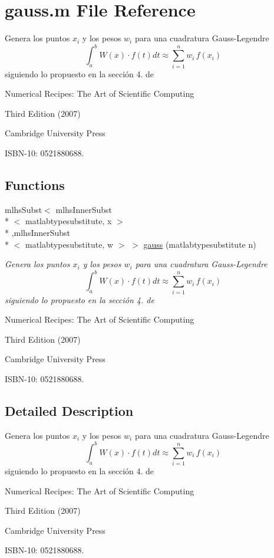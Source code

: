 \hypertarget{a00023}{\section{gauss.\-m File Reference}
\label{a00023}
}


Genera los puntos $ x_i $ y los pesos $ w_i $ para una cuadratura Gauss-\/\-Legendre \[ \int_{a}^b W(x) \cdot f(t) dt \approx \sum_{i=1}^{n} w_i \, f(x_i) \] siguiendo lo propuesto en la sección 4. de \par
 Numerical Recipes\-: The Art of Scientific Computing \par
 Third Edition (2007) \par
 Cambridge University Press \par
 I\-S\-B\-N-\/10\-: 0521880688.  


\subsection*{Functions}
\begin{DoxyCompactItemize}
\item 
mlhs\-Subst$<$ mlhs\-Inner\-Subst\\*
$<$ matlabtypesubstitute, x $>$\\*
,mlhs\-Inner\-Subst\\*
$<$ matlabtypesubstitute, w $>$ $>$ \hyperlink{a00023_a5cac7731040a0693793dfebeeb1bf85b}{gauss} (matlabtypesubstitute n)
\begin{DoxyCompactList}\small\item\em Genera los puntos $ x_i $ y los pesos $ w_i $ para una cuadratura Gauss-\/\-Legendre \[ \int_{a}^b W(x) \cdot f(t) dt \approx \sum_{i=1}^{n} w_i \, f(x_i) \] siguiendo lo propuesto en la sección 4. de \par
 Numerical Recipes\-: The Art of Scientific Computing \par
 Third Edition (2007) \par
 Cambridge University Press \par
 I\-S\-B\-N-\/10\-: 0521880688. \end{DoxyCompactList}\end{DoxyCompactItemize}


\subsection{Detailed Description}
Genera los puntos $ x_i $ y los pesos $ w_i $ para una cuadratura Gauss-\/\-Legendre \[ \int_{a}^b W(x) \cdot f(t) dt \approx \sum_{i=1}^{n} w_i \, f(x_i) \] siguiendo lo propuesto en la sección 4. de \par
 Numerical Recipes\-: The Art of Scientific Computing \par
 Third Edition (2007) \par
 Cambridge University Press \par
 I\-S\-B\-N-\/10\-: 0521880688. 

